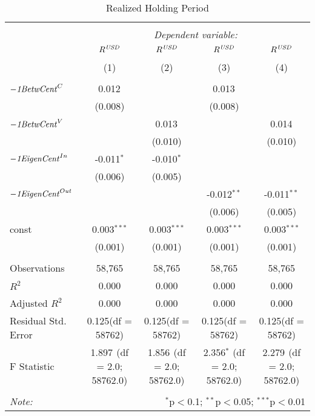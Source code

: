 \begin{table}[!htbp] \centering
  \caption{Realized Holding Period}
\begin{tabular}{@{\extracolsep{5pt}}lcccc}
\\[-1.8ex]\hline
\hline \\[-1.8ex]
& \multicolumn{4}{c}{\textit{Dependent variable:}} \
\cr \cline{4-5}
\\[-1.8ex] & \multicolumn{1}{c}{${R}^{\it USD}$} & \multicolumn{1}{c}{${R}^{\it USD}$} & \multicolumn{1}{c}{${R}^{\it USD}$} & \multicolumn{1}{c}{${R}^{\it USD}$}  \\
\\[-1.8ex] & (1) & (2) & (3) & (4) \\
\hline \\[-1.8ex]
 ${\it-1 BetwCent}^C$ & 0.012$^{}$ & & 0.013$^{}$ & \\
  & (0.008) & & (0.008) & \\
 ${\it-1 BetwCent}^V$ & & 0.013$^{}$ & & 0.014$^{}$ \\
  & & (0.010) & & (0.010) \\
 ${\it-1 EigenCent}^{In}$ & -0.011$^{*}$ & -0.010$^{*}$ & & \\
  & (0.006) & (0.005) & & \\
 ${\it-1 EigenCent}^{Out}$ & & & -0.012$^{**}$ & -0.011$^{**}$ \\
  & & & (0.006) & (0.005) \\
 const & 0.003$^{***}$ & 0.003$^{***}$ & 0.003$^{***}$ & 0.003$^{***}$ \\
  & (0.001) & (0.001) & (0.001) & (0.001) \\
\hline \\[-1.8ex]
 Observations & 58,765 & 58,765 & 58,765 & 58,765 \\
 $R^2$ & 0.000 & 0.000 & 0.000 & 0.000 \\
 Adjusted $R^2$ & 0.000 & 0.000 & 0.000 & 0.000 \\
 Residual Std. Error & 0.125(df = 58762) & 0.125(df = 58762) & 0.125(df = 58762) & 0.125(df = 58762)  \\
 F Statistic & 1.897$^{}$ (df = 2.0; 58762.0) & 1.856$^{}$ (df = 2.0; 58762.0) & 2.356$^{*}$ (df = 2.0; 58762.0) & 2.279$^{}$ (df = 2.0; 58762.0) \\
\hline
\hline \\[-1.8ex]
\textit{Note:} & \multicolumn{4}{r}{$^{*}$p$<$0.1; $^{**}$p$<$0.05; $^{***}$p$<$0.01} \\
\end{tabular}
\end{table}